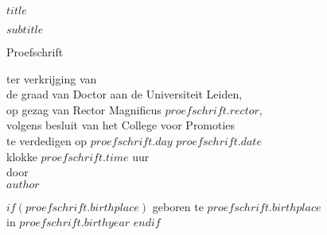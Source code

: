 \clearpage
\thispagestyle{empty}
\begin{center}
\Huge\textbf{$title$}\par
\vspace{\baselineskip}
\huge\textit{$subtitle$}\par
\vfill %
    \Large{Proefschrift}\par
    \vspace{\baselineskip}
    \linespread{1.3}
    \large{ter verkrijging van \\
    de graad van Doctor aan de Universiteit Leiden, \\
    op gezag van Rector Magnificus $proefschrift.rector$, \\
    volgens besluit van het College voor Promoties \\
    te verdedigen op $proefschrift.day$ $proefschrift.date$ \\
    klokke $proefschrift.time$ uur \\[1.5cm]
    door} \\[1.5cm]
    \Large{$author$}\par
$if(proefschrift.birthplace)$
    \vspace{\baselineskip}
    \large{geboren te $proefschrift.birthplace$ \\
    in $proefschrift.birthyear$}
$endif$
\end{center}

